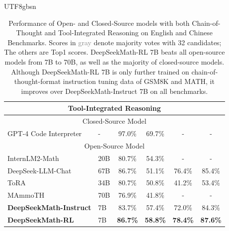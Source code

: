 \documentclass[11pt, a4paper, logo, copyright, nonumbering]{deepseek}
\newcommand{\spmath}{DeepSeekMath}
\begin{document}
\begin{CJK*}{UTF8}{gbsn}
\begin{table}[t!]
{\begin{tabular}{llcccc}
\midrule
\midrule
\multicolumn{6}{c}{\textbf{Tool-Integrated Reasoning}}                                                                                                                          \\ 
\midrule
\multicolumn{6}{c}{Closed-Source Model}                                                                                                                                         \\ 
\midrule
GPT-4 Code Interpreter &   -   & 97.0\%                         & 69.7\%          &            -     &          -                                                      \\ 
\midrule
\multicolumn{6}{c}{Open-Source Model}                                                                                                                                           \\ 
\midrule
InternLM2-Math & 20B           & 80.7\%                         & 54.3\%          &          -       &      -                                                               \\
DeepSeek-LLM-Chat & 67B        & 86.7\%                & 51.1\%          & 76.4\%          & 85.4\%                                                            \\
ToRA & 34B                     & 80.7\%                         & 50.8\%          & 41.2\%          & 53.4\%                                                              \\
MAmmoTH & 70B                  & 76.9\%                         & 41.8\%          &          -       &            -                                                         \\ 
\midrule
\textbf{\spmath-Instruct} & 7B     & 83.7\%                         & 57.4\%          & 72.0\%          & 84.3\%                                                                \\
\textbf{\spmath-RL} & 7B           & \textbf{86.7\%}                         & \textbf{58.8\%} & \textbf{78.4\%} & \textbf{87.6\%}                                                       \\
\bottomrule
\end{tabular}
}
    \caption{
   Performance of Open- and Closed-Source models with both Chain-of-Thought and Tool-Integrated Reasoning on English and Chinese Benchmarks.
   Scores in \textcolor{gray}{gray} denote majority votes with 32 candidates; The others are Top1 scores.
   \spmath-RL 7B beats all open-source models from 7B to 70B, as well as the majority of closed-source models. Although \spmath-RL 7B is only further trained on chain-of-thought-format instruction tuning data of GSM8K and MATH, it improves over \spmath-Instruct 7B on all benchmarks.
   }
    \label{tab:sft_rl_math}
\end{table}
\endgroup



\end{CJK*}
\end{document}
